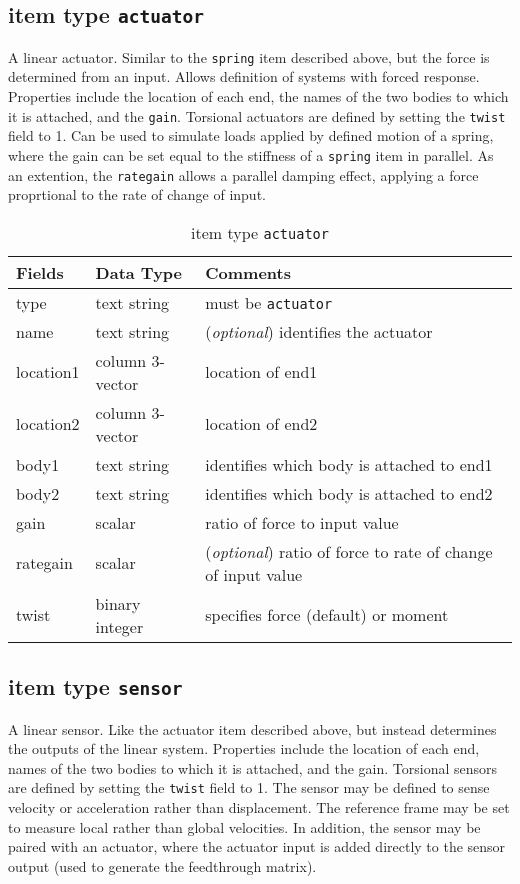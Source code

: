 \subsection{item type \texttt{actuator}}
A linear actuator. Similar to the \texttt{spring} item described above, but the force is determined from an input.  Allows definition of systems with forced response. Properties include the location of each end, the names of the two bodies to which it is attached, and the \texttt{gain}.  Torsional actuators are defined by setting the \texttt{twist} field to 1.  Can be used to simulate loads applied by defined motion of a spring, where the gain can be set equal to the stiffness of a \texttt{spring} item in parallel.  As an extention, the \texttt{rategain} allows a parallel damping effect, applying a force proprtional to the rate of change of input.

\begin{table}[!h]
\caption{item type \texttt{actuator}}
\label{actuator}
\begin{center}
\begin{tabular}{lll}
\toprule
Fields & Data Type & Comments\\
\midrule
type & text string & must be \texttt{actuator}\\
name & text string & (\emph{optional}) identifies the actuator\\
location1 & column 3-vector & location of end1\\
location2 & column 3-vector & location of end2\\
body1 & text string & identifies which body is attached to end1\\
body2 & text string & identifies which body is attached to end2\\
gain & scalar & ratio of force to input value\\
rategain & scalar & (\emph{optional}) ratio of force to rate of change of input value\\
twist & binary integer &  specifies force (default) or moment\\
\bottomrule
\end{tabular}
\end{center}
\end{table}
\clearpage

\subsection{item type \texttt{sensor}}
A linear sensor. Like the actuator item described above, but instead determines the outputs of the linear system.  Properties include the location of each end, names of the two bodies to which it is attached, and the gain.  Torsional sensors are defined by setting the \texttt{twist} field to 1.  The sensor may be defined to sense velocity or acceleration rather than displacement.  The reference frame may be set to measure local rather than global velocities.  In addition, the sensor may be paired with an actuator, where the actuator input is added directly to the sensor output (used to generate the feedthrough matrix).

